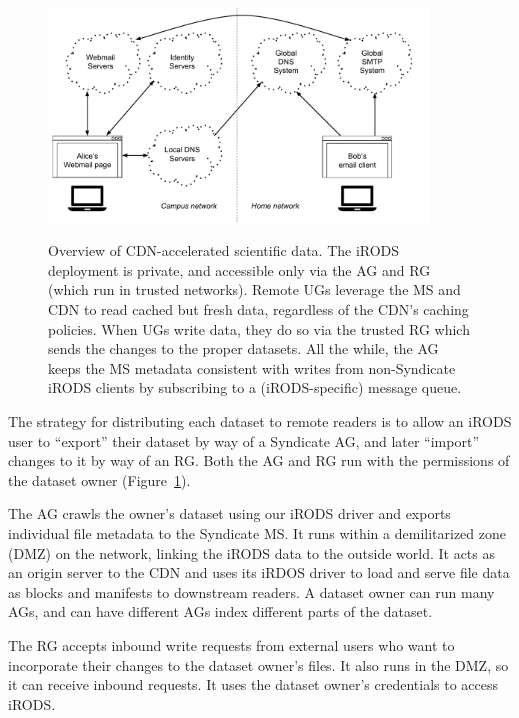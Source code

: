 \begin{figure}[h]
   \caption{Overview of CDN-accelerated scientific data.  The iRODS deployment
   is private, and accessible only via the AG and RG (which run in trusted
   networks).  Remote UGs leverage the MS and CDN to read cached but fresh data,
   regardless of the CDN's caching policies.  When UGs write data, they do so
   via the trusted RG which sends the changes to the proper datasets.  All the
   while, the AG keeps the MS metadata consistent with writes from non-Syndicate
   iRODS clients by subscribing to a (iRODS-specific) message queue.}
   \centering
   \includegraphics[width=0.9\textwidth,page=25]{figures/dissertation-figures}
   \label{fig:chap4-syndicate-datasets}
\end{figure}

The strategy for distributing each dataset to remote readers is to allow an
iRODS user to ``export'' their dataset by way of a Syndicate AG, and later
``import'' changes to it by way of an RG.  Both the AG and RG run with the
permissions of the dataset owner (Figure~\ref{fig:chap4-syndicate-datasets}).

The AG crawls the owner's dataset using
our iRODS driver and exports individual file metadata to the Syndicate MS.
It runs within a demilitarized zone (DMZ) on the network, linking the iRODS data
to the outside world.  It acts as an origin
server to the CDN and uses its iRDOS driver to load and serve file data as blocks and
manifests to downstream readers.  A dataset owner can run many AGs, and can have
different AGs index different parts of the dataset.

The RG accepts inbound write requests from external users who want to
incorporate their changes to the dataset owner's files.  It also runs in the
DMZ, so it can receive inbound requests.  It uses the dataset owner's
credentials to access iRODS.

